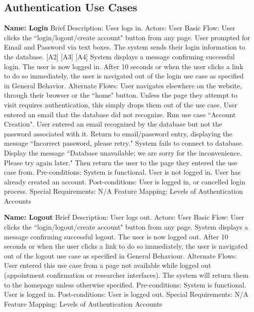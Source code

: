 \subsection{Authentication Use Cases}
\begin{outline}[enumerate]
\1 {\bf Name: Login}
\2 Brief Description: User logs in.
\2 Actors: User
\2 Basic Flow:
\3 User clicks the ``login/logout/create account" button from any page.
\3 User prompted for Email and Password via text boxes.
\3 The system sends their login information to the database. [A2] [A3] [A4]
\3 System displays a message confirming successful login.  The user is now logged in.
\3 After 10 seconds or when the user clicks a link to do so immediately, the user is navigated out of the login use case as specified in General Behavior.
\2 Alternate Flows:
\3 [A1] User navigates elsewhere on the website, through their browser or the ``home" button.  Unless the page they attempt to visit requires authentication, this simply drops them out of the use case.
\3 [A2] User entered an email that the database did not recognize.  Run use case ``Account Creation".
\3 [A3] User entered an email recognized by the database but not the password associated with it.  Return to email/password entry, displaying the message ``Incorrect password, please retry."
\3 [A4] System fails to connect to database.  Display the message ``Database unavailable; we are sorry for the inconvenience.  Please try again later."  Then return the user to the page they entered the use case from.
\2 Pre-conditions:
\3 System is functional.
\3 User is not logged in.
\3 User has already created an account.
\2 Post-conditions:
\3 User is logged in, or cancelled login process.
\2 Special Requirements:
\3 N/A
\2 Feature Mapping:
\3 Levels of Authentication
\3 Accounts

\1 {\bf Name: Logout}
\2 Brief Description: User logs out.
\2 Actors: User
\2 Basic Flow:
\3 User clicks the ``login/logout/create account" button from any page.
\3 System displays a message confirming successful logout.  The user is now logged out.
\3 After 10 seconds or when the user clicks a link to do so immediately, the user is navigated out of the logout use case as specified in General Behaviour.
\2 Alternate Flows:
\3 [A1] User entered this use case from a page not available while logged out (appointment confirmation or researcher interfaces).  The system will return them to the homepage unless otherwise specified.
\2 Pre-conditions:
\3 System is functional.
\3 User is logged in.
\2 Post-conditions:
\3 User is logged out.
\2 Special Requirements:
\3 N/A
\2 Feature Mapping:
\3 Levels of Authentication
\3 Accounts


\end{outline}
